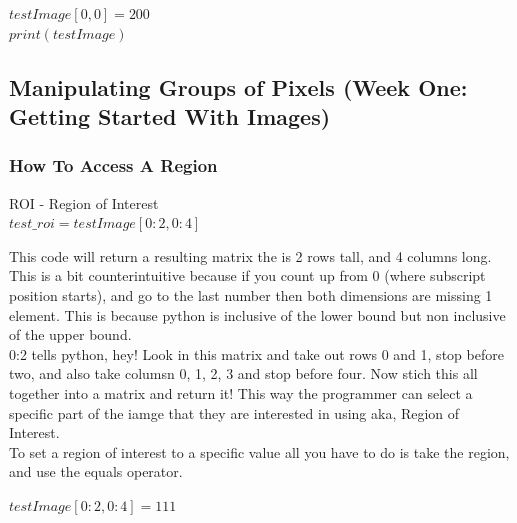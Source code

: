 \documentclass[fleqn]{article}
\begin{document}
    \begin{center}
      $testImage[0,0]=200$\\
      $print(testImage)$
    \end{center}

    \subsection{Manipulating Groups of Pixels (Week One: Getting Started With Images)}
    \subsubsection{How To Access A Region}

    \begin{center}
      ROI - Region of Interest\\
      $test\_roi = testImage[0:2,0:4]$\\
    \end{center}

    This code will return a resulting matrix the is 2 rows tall, and 4 columns long. This is a bit counterintuitive because if you count up from 0 (where subscript position starts), and go to the last number then both dimensions are missing 1 element. This is because python is inclusive of the lower bound but non inclusive of the upper bound. \\
    0:2 tells python, hey! Look in this matrix and take out rows 0 and 1, stop before two, and also take columsn 0, 1, 2, 3 and stop before four. Now stich this all together into a matrix and return it! This way the programmer can select a specific part of the iamge that they are interested in using aka, Region of Interest.\\
    To set a region of interest to a specific value all you have to do is take the region, and use the equals operator.

    \begin{center}
      $testImage[0:2,0:4] = 111$
    \end{center}
\end{document}

